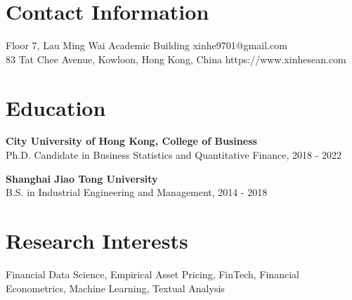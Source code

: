 \documentclass[margin]{res}
\begin{document}
\begin{resume}




\section{\sc Contact Information}
	Floor 7, Lau Ming Wai Academic Building	   \hfill xinhe9701@gmail.com\\        
	83 Tat Chee Avenue, Kowloon, Hong Kong, China 	\hfill   https://www.xinhesean.com \\

\vspace{5mm}

\section{\sc Education}
\textbf{City University of Hong Kong, College of Business}\\
{Ph.D. Candidate in Business Statistics and Quantitative Finance, 2018 - 2022}

\textbf{Shanghai Jiao Tong University}\\
{B.S. in Industrial Engineering and Management, 2014 - 2018}

\vspace{5mm}

\section{\sc Research Interests}
{Financial Data Science, Empirical Asset Pricing, FinTech, Financial Econometrics, Machine Learning, Textual Analysis}


\end{resume}
\end{document}
